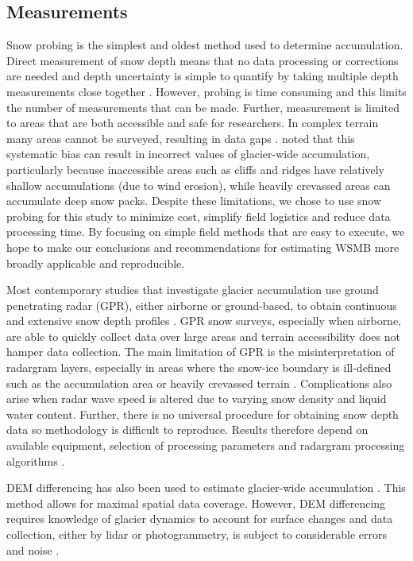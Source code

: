 \documentclass[twocolumn,letterpaper]{igs}
\begin{document}
\subsection{Measurements}

Snow probing is the simplest and oldest method used to determine accumulation. Direct measurement of snow depth means that no data processing or corrections are needed and depth uncertainty is simple to quantify by taking multiple depth measurements close together \citep{Sold2013}. However, probing is time consuming and this limits the number of measurements that can be made. Further, measurement is limited to areas that are both accessible and safe for researchers. In complex terrain many areas cannot be surveyed, resulting in data gaps \citep{Deems2006, Sold2014}. \cite{Sold2013} noted that this systematic bias can result in incorrect values of glacier-wide accumulation, particularly because inaccessible areas such as cliffs and ridges have relatively shallow accumulations (due to wind erosion), while heavily crevassed areas can accumulate deep snow packs. Despite these limitations, we chose to use snow probing for this study to minimize cost, simplify field logistics and reduce data processing time. By focusing on simple field methods that are easy to execute, we hope to make our conclusions and recommendations for estimating WSMB more broadly applicable and reproducible.
 
Most contemporary studies that investigate glacier accumulation use ground penetrating radar (GPR), either airborne or ground-based, to obtain continuous and extensive snow depth profiles \citep[e.g.][]{Winther1998,Machguth2006, Gusmeroli2014, McGrath2015}. GPR snow surveys, especially when airborne, are able to quickly collect data over large areas and terrain accessibility does not hamper data collection. The main limitation of GPR is the misinterpretation of radargram layers, especially in areas where the snow-ice boundary is ill-defined such as the accumulation area or heavily crevassed terrain \citep{Machguth2006, Gusmeroli2014, McGrath2015}. Complications also arise when radar wave speed is altered due to varying snow density and liquid water content. Further, there is no universal procedure for obtaining snow depth data so methodology is difficult to reproduce.  Results therefore depend on available equipment, selection of processing parameters and radargram processing algorithms \citep{Sold2013}.

DEM differencing has also been used to estimate glacier-wide accumulation \citep{Deems2006,Nolan2015}. This method allows for maximal spatial data coverage. However, DEM differencing requires knowledge of glacier dynamics to account for surface changes and data collection, either by lidar or photogrammetry, is subject to considerable errors and noise \citep{Deems2006,Nolan2015}. 
\end{document}
